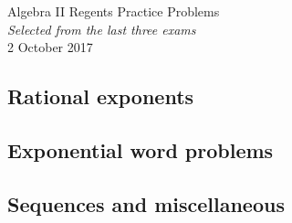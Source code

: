 \documentclass[]{book}
\begin{document}
\begin{center}
{\Large Algebra II Regents Practice Problems}\\
\textit{Selected from the last three exams}\\ %
2 October 2017%
\end{center}

\vspace{0.2 cm}


\begin{enumerate}
\subsection*{Rational exponents}


\newpage
\subsection*{Exponential word problems}


\subsection*{Sequences and miscellaneous}



\end{enumerate}
\end{document}
